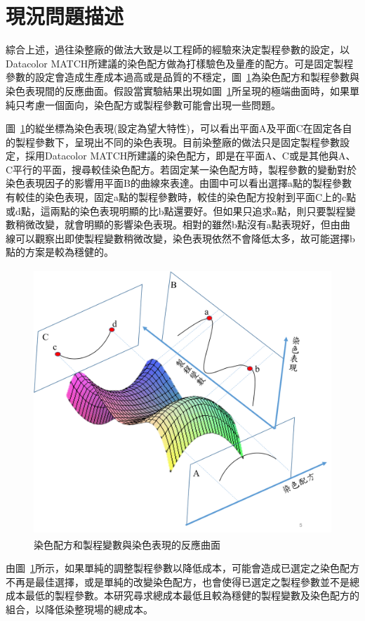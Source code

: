 \section{現況問題描述}
\label{c:ch3.2}
綜合上述，過往染整廠的做法大致是以工程師的經驗來決定製程參數的設定，以Datacolor MATCH所建議的染色配方做為打樣驗色及量產的配方。可是固定製程參數的設定會造成生產成本過高或是品質的不穩定，圖~\ref{fig:graph2}為染色配方和製程參數與染色表現間的反應曲面。假設當實驗結果出現如圖~\ref{fig:graph2}所呈現的極端曲面時，如果單純只考慮一個面向，染色配方或製程參數可能會出現一些問題。

圖~\ref{fig:graph2}的緃坐標為染色表現(設定為望大特性)，可以看出平面A及平面C在固定各自的製程參數下，呈現出不同的染色表現。目前染整廠的做法只是固定製程參數設定，採用Datacolor MATCH所建議的染色配方，即是在平面A、C或是其他與A、C平行的平面，搜尋較佳染色配方。若固定某一染色配方時，製程參數的變動對於染色表現因子的影響用平面B的曲線來表達。由圖中可以看出選擇a點的製程參數有較佳的染色表現，固定a點的製程參數時，較佳的染色配方投射到平面C上的c點或d點，這兩點的染色表現明顯的比b點還要好。但如果只追求a點，則只要製程變數稍微改變，就會明顯的影響染色表現。相對的雖然b點沒有a點表現好，但由曲線可以觀察出即使製程變數稍微改變，染色表現依然不會降低太多，故可能選擇b點的方案是較為穩健的。
\begin{figure} 
\centering
\includegraphics[width=12cm,height=10cm]{Graph/graph2.png}
\caption{染色配方和製程變數與染色表現的反應曲面}
\label{fig:graph2}
\end{figure}

由圖~\ref{fig:graph2}所示，如果單純的調整製程參數以降低成本，可能會造成已選定之染色配方不再是最佳選擇，或是單純的改變染色配方，也會使得已選定之製程參數並不是總成本最低的製程參數。本研究尋求總成本最低且較為穩健的製程變數及染色配方的組合，以降低染整現場的總成本。